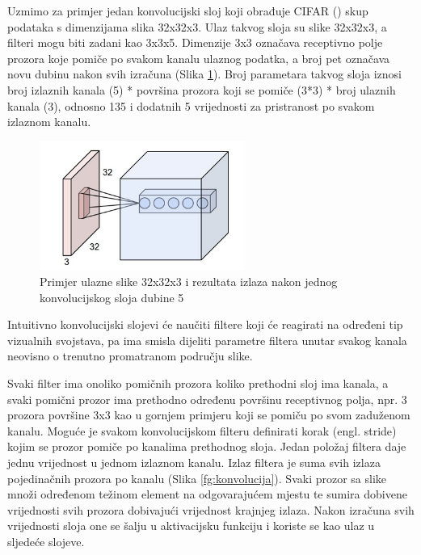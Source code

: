 \documentclass[times, utf8, proizvoljni, numeric]{fer}
\begin{document}
Uzmimo za primjer jedan konvolucijski sloj koji obrađuje CIFAR (\cite{CIFAR10}) skup podataka s dimenzijama slika 32x32x3. Ulaz takvog sloja su slike 32x32x3, a filteri mogu biti zadani kao 3x3x5. Dimenzije 3x3 označava receptivno polje prozora koje pomiče po svakom kanalu ulaznog podatka, a broj pet označava novu dubinu nakon svih izračuna (Slika \ref{fg:konvolucijski_sloj}). Broj parametara takvog sloja iznosi broj izlaznih kanala (5) * površina prozora koji se pomiče (3*3) * broj ulaznih kanala (3), odnosno 135 i dodatnih 5 vrijednosti za pristranost po svakom izlaznom kanalu.

\begin{figure}[!ht]
	\begin{center}
		\captionsetup{justification=centering}
		\includegraphics[width=0.6\textwidth]{./imgs/konvolucijski_sloj.png}
		\caption{Primjer ulazne slike 32x32x3 i rezultata izlaza nakon jednog konvolucijskog sloja dubine 5 \cite{CS231n}}
		\label{fg:konvolucijski_sloj}
	\end{center}
\end{figure}

Intuitivno konvolucijski slojevi će naučiti filtere koji će reagirati na određeni tip vizualnih svojstava, pa ima smisla dijeliti parametre filtera unutar svakog kanala neovisno o trenutno promatranom području slike.

Svaki filter ima onoliko pomičnih prozora koliko prethodni sloj ima kanala, a svaki pomični prozor ima prethodno određenu površinu receptivnog polja, npr. 3 prozora površine 3x3 kao u gornjem primjeru koji se pomiču po svom zaduženom kanalu. Moguće je svakom konvolucijskom filteru definirati korak (engl. stride) kojim se prozor pomiče po kanalima prethodnog sloja. Jedan položaj filtera daje jednu vrijednost u jednom izlaznom kanalu. Izlaz filtera je suma svih izlaza pojedinačnih prozora po kanalu (Slika \ref{fg:konvolucija}). Svaki prozor sa slike množi određenom težinom element na odgovarajućem mjestu te sumira dobivene vrijednosti svih prozora dobivajući vrijednost krajnjeg izlaza. Nakon izračuna svih vrijednosti sloja one se šalju u aktivacijsku funkciju i koriste se kao ulaz u sljedeće slojeve. 
\end{document}
